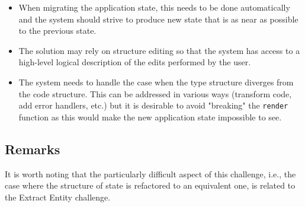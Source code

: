 \documentclass[english,submission]{programming}
\begin{document}
\begin{itemize}
\item When migrating the application state, this needs to be done automatically and the system should strive to produce new state that is as near as possible to the previous state.
\item The solution may rely on structure editing so that the system has access to a high-level logical description of the edits performed by the user.
\item The system needs to handle the case when the type structure diverges from the code structure. This can be addressed in various ways (transform code, add error handlers, etc.) but it is desirable to avoid "breaking" the \texttt{render} function as this would make the new application state impossible to see.
\end{itemize}

\subsection{Remarks}
It is worth noting that the particularly difficult aspect of this challenge, i.e., the case where the structure of state is refactored to an equivalent one, is related to the Extract Entity challenge.

\end{document}
